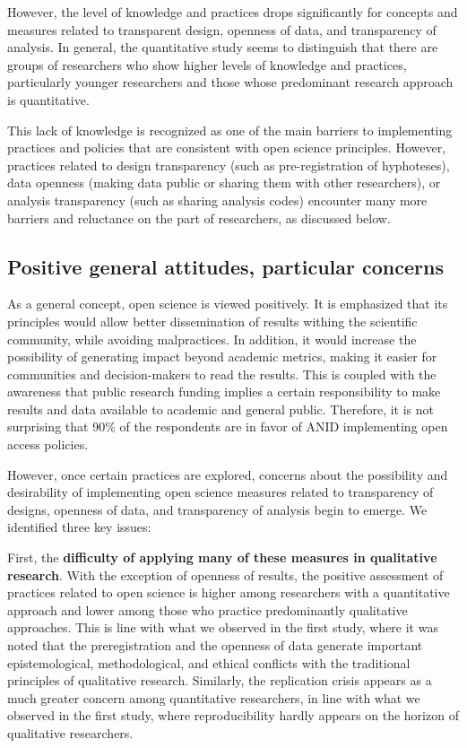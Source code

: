 \documentclass[
  letterpaper,
  DIV=11,
  numbers=noendperiod]{scrartcl}
\begin{document}
However, the level of knowledge and practices drops significantly for
concepts and measures related to transparent design, openness of data,
and transparency of analysis. In general, the quantitative study seems
to distinguish that there are groups of researchers who show higher
levels of knowledge and practices, particularly younger researchers and
those whose predominant research approach is quantitative.

This lack of knowledge is recognized as one of the main barriers to
implementing practices and policies that are consistent with open
science principles. However, practices related to design transparency
(such as pre-registration of hyphoteses), data openness (making data
public or sharing them with other researchers), or analysis transparency
(such as sharing analysis codes) encounter many more barriers and
reluctance on the part of researchers, as discussed below.

\hypertarget{positive-general-attitudes-particular-concerns}{%
\subsection{Positive general attitudes, particular
concerns}\label{positive-general-attitudes-particular-concerns}}

As a general concept, open science is viewed positively. It is
emphasized that its principles would allow better dissemination of
results withing the scientific community, while avoiding malpractices.
In addition, it would increase the possibility of generating impact
beyond academic metrics, making it easier for communities and
decision-makers to read the results. This is coupled with the awareness
that public research funding implies a certain responsibility to make
results and data available to academic and general public. Therefore, it
is not surprising that 90\% of the respondents are in favor of ANID
implementing open access policies.

However, once certain practices are explored, concerns about the
possibility and desirability of implementing open science measures
related to transparency of designs, openness of data, and transparency
of analysis begin to emerge. We identified three key issues:

First, the \textbf{difficulty of applying many of these measures in
qualitative research}. With the exception of openness of results, the
positive assessment of practices related to open science is higher among
researchers with a quantitative approach and lower among those who
practice predominantly qualitative approaches. This is line with what we
observed in the first study, where it was noted that the preregistration
and the openness of data generate important epistemological,
methodological, and ethical conflicts with the traditional principles of
qualitative research. Similarly, the replication crisis appears as a
much greater concern among quantitative researchers, in line with what
we observed in the first study, where reproducibility hardly appears on
the horizon of qualitative researchers.
\end{document}
